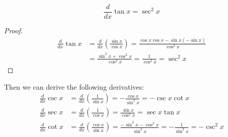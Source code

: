 \begin{theorem}
    \[\frac{d}{dx}\tan x=\sec^2 x\]
\end{theorem}
\begin{proof}
    \begin{align*}
        \frac{d}{dx}\tan x&= \frac{d}{dx}\left(\frac{\sin x}{\cos x}\right)
        =\frac{\cos x\cos x-\sin x(-\sin x)}{\cos^2 x}  \\
        &= \frac{\sin^2 x+\cos^2 x}{\cos^2 x}=\frac{1}{\cos^2 x}
        =\sec^2 x 
    \end{align*}
\end{proof}
Then we can derive the following derivatives:
\begin{align*}
    \frac{d}{dx}\csc x &= \frac{d}{dx}\left(\frac{1}{\sin x}\right)
    =-\frac{\cos x}{\sin^2 x}=-\csc x\cot x \\
    \frac{d}{dx}\sec x &= \frac{d}{dx}\left(\frac{1}{\cos x}\right)
    =\frac{\sin x}{\cos^2 x}=\sec x\tan x \\
    \frac{d}{dx}\cot x &= \frac{d}{dx}\left(\frac{\cos x}{\sin x}\right)
    =\frac{-\sin^2 x-\cos^2 x}{\sin^2 x}=-\frac{1}{\sin^2 x}=-\csc^2 x
\end{align*}

